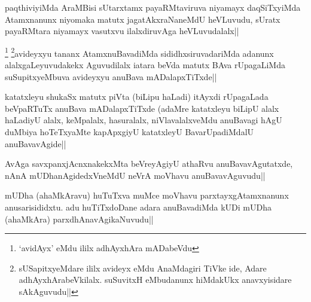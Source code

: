 \begin{artha}%
paqthiviyiMda AraMBisi sUtarxtamx payaRMtaviruva niyamayx daqSiTxyiMda Atamxnanunx niyomaka matutx jagatAkxraNaneMdU heVLuvudu, sUratx payaRMtara niyamayx vasutxvu ilalxdiruvAga heVLuvudalalx||
\end{artha}

\begin{artha}
\footnote[1]{`avidAyx' eMdu ililx adhAyxhAra mADabeVdu} \footnote[2]{sUSapitxyeMdare ililx avideyx eMdu AnaMdagiri TiVke ide, Adare adhAyxhArabeVkilalx. suSuvitxH eMbudanunx hiMdakUkx anavxyisidare sAkAguvudu||}avideyxyu tananx AtamxnuBavadiMda sididhxsiruvadariMda adanunx alalxgaLeyuvudakekx Aguvudilalx iatara beVda matutx BAva rUpagaLiMda suSupitxyeMbuva avideyxyu anuBava mADalapxTiTxde||
\end{artha}


\begin{artha}
katatxleyu shukaSx matutx piVta (biLipu haLadi) itAyxdi rUpagaLada beVpaRTuTx anuBava mADalapxTiTxde (adaMre katatxleyu biLipU alalx haLadiyU alalx, keMpalalx, hasuralalx, niVlavalalxveMdu anuBavagi hAgU duMbiya hoTeTxyaMte kapApxgiyU katatxleyU BavarUpadiMdalU anuBavavAgide||
\end{artha}

\begin{artha}
AvAga savxpanxjAcnxnakekxMta beVreyAgiyU athaRvu anuBavavAgutatxde, nAnA mUDhanAgidedxVneMdU neVrA moVhavu anuBavavAguvudu||
\end{artha}%


\begin{artha}
mUDha (ahaMkAravu) huTuTxva muMce moVhavu parxtayxgAtamxnanunx anusarisididxtu. adu huTiTxdoDane adara anuBavadiMda kUDi mUDha (ahaMkAra) parxdhAnavAgikaNuvudu||
\end{artha}

